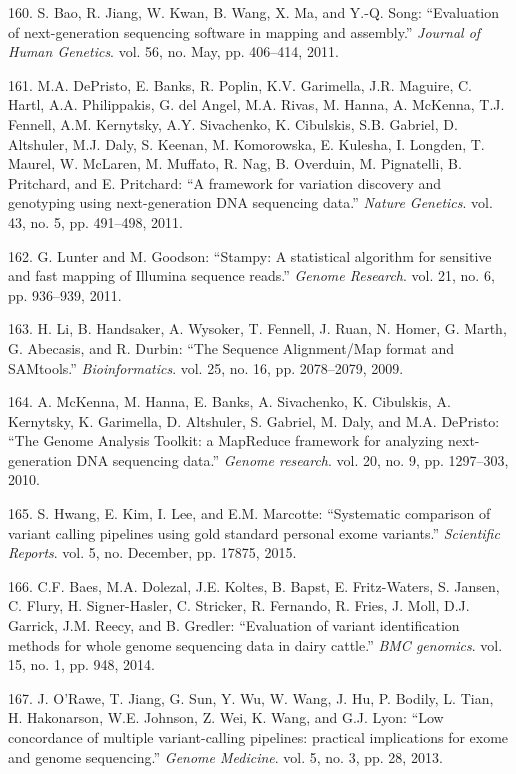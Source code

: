\documentclass[12pt,a4paper,twoside]{ugathesis}
\theoremstyle{definition}
\theoremstyle{definition}
\theoremstyle{definition}
\theoremstyle{remark}
\begin{document}
\hypertarget{ref-Bao2011}{}
160. S. Bao, R. Jiang, W. Kwan, B. Wang, X. Ma, and Y.-Q. Song:
``Evaluation of next-generation sequencing software in mapping and
assembly.'' \emph{Journal of Human Genetics}. vol. 56, no. May, pp.
406--414, 2011.

\hypertarget{ref-DePristo2011}{}
161. M.A. DePristo, E. Banks, R. Poplin, K.V. Garimella, J.R. Maguire,
C. Hartl, A.A. Philippakis, G. del Angel, M.A. Rivas, M. Hanna, A.
McKenna, T.J. Fennell, A.M. Kernytsky, A.Y. Sivachenko, K. Cibulskis,
S.B. Gabriel, D. Altshuler, M.J. Daly, S. Keenan, M. Komorowska, E.
Kulesha, I. Longden, T. Maurel, W. McLaren, M. Muffato, R. Nag, B.
Overduin, M. Pignatelli, B. Pritchard, and E. Pritchard: ``A framework
for variation discovery and genotyping using next-generation DNA
sequencing data.'' \emph{Nature Genetics}. vol. 43, no. 5, pp. 491--498,
2011.

\hypertarget{ref-Lunter2011}{}
162. G. Lunter and M. Goodson: ``Stampy: A statistical algorithm for
sensitive and fast mapping of Illumina sequence reads.'' \emph{Genome
Research}. vol. 21, no. 6, pp. 936--939, 2011.

\hypertarget{ref-Li2009}{}
163. H. Li, B. Handsaker, A. Wysoker, T. Fennell, J. Ruan, N. Homer, G.
Marth, G. Abecasis, and R. Durbin: ``The Sequence Alignment/Map format
and SAMtools.'' \emph{Bioinformatics}. vol. 25, no. 16, pp. 2078--2079,
2009.

\hypertarget{ref-McKenna2010}{}
164. A. McKenna, M. Hanna, E. Banks, A. Sivachenko, K. Cibulskis, A.
Kernytsky, K. Garimella, D. Altshuler, S. Gabriel, M. Daly, and M.A.
DePristo: ``The Genome Analysis Toolkit: a MapReduce framework for
analyzing next-generation DNA sequencing data.'' \emph{Genome research}.
vol. 20, no. 9, pp. 1297--303, 2010.

\hypertarget{ref-Hwang2015}{}
165. S. Hwang, E. Kim, I. Lee, and E.M. Marcotte: ``Systematic
comparison of variant calling pipelines using gold standard personal
exome variants.'' \emph{Scientific Reports}. vol. 5, no. December, pp.
17875, 2015.

\hypertarget{ref-Baes2014}{}
166. C.F. Baes, M.A. Dolezal, J.E. Koltes, B. Bapst, E. Fritz-Waters, S.
Jansen, C. Flury, H. Signer-Hasler, C. Stricker, R. Fernando, R. Fries,
J. Moll, D.J. Garrick, J.M. Reecy, and B. Gredler: ``Evaluation of
variant identification methods for whole genome sequencing data in dairy
cattle.'' \emph{BMC genomics}. vol. 15, no. 1, pp. 948, 2014.

\hypertarget{ref-ORawe2013}{}
167. J. O'Rawe, T. Jiang, G. Sun, Y. Wu, W. Wang, J. Hu, P. Bodily, L.
Tian, H. Hakonarson, W.E. Johnson, Z. Wei, K. Wang, and G.J. Lyon: ``Low
concordance of multiple variant-calling pipelines: practical
implications for exome and genome sequencing.'' \emph{Genome Medicine}.
vol. 5, no. 3, pp. 28, 2013.
\end{document}
